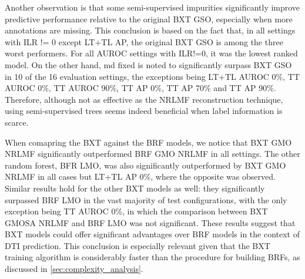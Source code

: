 Another observation is that some semi-supervised impurities significantly improve predictive performance relative to the original BXT GSO, especially when more annotations are missing. This conclusion is based on the fact that, in all settings with ILR != 0 except LT+TL AP, the original BXT GSO is among the three worst performers. For all AUROC settings with ILR!=0, it was the lowest ranked model. On the other hand, md fixed is noted to significantly surpass BXT GSO in 10 of the 16 evaluation settings, the exceptions being LT+TL AUROC 0\%, TT AUROC 0\%, TT AUROC 90\%, TT AP 0\%, TT AP 70\% and TT AP 90\%. Therefore, although not as effective as the NRLMF reconstruction technique, using semi-supervised trees seems indeed beneficial when label information is scarce.


When comapring the BXT against the BRF models, we notice that BXT GMO NRLMF significantly outperformed BRF GMO NRLMF in all settings. The other random forest, BFR LMO, was also significantly outperformed by BXT GMO NRLMF in all cases but LT+TL AP 0\%, where the opposite was observed. Similar results hold for the other BXT models as well: they significantly surpassed BRF LMO in the vast majority of test configurations, with the only exception being TT AUROC 0\%, in which the comparison between BXT GMOSA NRLMF and BRF LMO was not significant. These results suggest that BXT models could offer significant advantages over BRF models in the context of DTI prediction. This conclusion is especially relevant given that the BXT training algorithm is considerably faster than the procedure for building BRFs, as discussed in \autoref{sec:complexity_analysis}.



